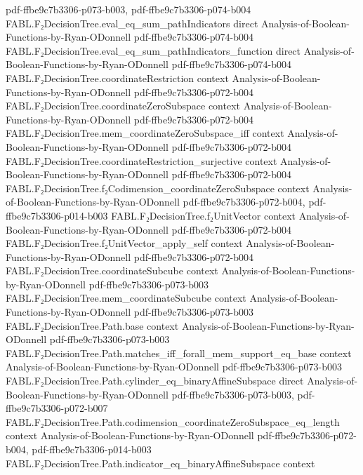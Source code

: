 \begin{theorem}
  {pdf-ffbe9c7b3306-p073-b003,
    pdf-ffbe9c7b3306-p074-b004}
\proofstep
  {FABL.F₂DecisionTree.eval_eq_sum_pathIndicators}
  {direct}
  {Analysis-of-Boolean-Functions-by-Ryan-ODonnell}
  {pdf-ffbe9c7b3306-p074-b004}
\proofstep
  {FABL.F₂DecisionTree.eval_eq_sum_pathIndicators_function}
  {direct}
  {Analysis-of-Boolean-Functions-by-Ryan-ODonnell}
  {pdf-ffbe9c7b3306-p074-b004}
\proofstep
  {FABL.F₂DecisionTree.coordinateRestriction}
  {context}
  {Analysis-of-Boolean-Functions-by-Ryan-ODonnell}
  {pdf-ffbe9c7b3306-p072-b004}
\proofstep
  {FABL.F₂DecisionTree.coordinateZeroSubspace}
  {context}
  {Analysis-of-Boolean-Functions-by-Ryan-ODonnell}
  {pdf-ffbe9c7b3306-p072-b004}
\proofstep
  {FABL.F₂DecisionTree.mem_coordinateZeroSubspace_iff}
  {context}
  {Analysis-of-Boolean-Functions-by-Ryan-ODonnell}
  {pdf-ffbe9c7b3306-p072-b004}
\proofstep
  {FABL.F₂DecisionTree.coordinateRestriction_surjective}
  {context}
  {Analysis-of-Boolean-Functions-by-Ryan-ODonnell}
  {pdf-ffbe9c7b3306-p072-b004}
\proofstep
  {FABL.F₂DecisionTree.f₂Codimension_coordinateZeroSubspace}
  {context}
  {Analysis-of-Boolean-Functions-by-Ryan-ODonnell}
  {pdf-ffbe9c7b3306-p072-b004,
    pdf-ffbe9c7b3306-p014-b003}
\proofstep
  {FABL.F₂DecisionTree.f₂UnitVector}
  {context}
  {Analysis-of-Boolean-Functions-by-Ryan-ODonnell}
  {pdf-ffbe9c7b3306-p072-b004}
\proofstep
  {FABL.F₂DecisionTree.f₂UnitVector_apply_self}
  {context}
  {Analysis-of-Boolean-Functions-by-Ryan-ODonnell}
  {pdf-ffbe9c7b3306-p072-b004}
\proofstep
  {FABL.F₂DecisionTree.coordinateSubcube}
  {context}
  {Analysis-of-Boolean-Functions-by-Ryan-ODonnell}
  {pdf-ffbe9c7b3306-p073-b003}
\proofstep
  {FABL.F₂DecisionTree.mem_coordinateSubcube}
  {context}
  {Analysis-of-Boolean-Functions-by-Ryan-ODonnell}
  {pdf-ffbe9c7b3306-p073-b003}
\proofstep
  {FABL.F₂DecisionTree.Path.base}
  {context}
  {Analysis-of-Boolean-Functions-by-Ryan-ODonnell}
  {pdf-ffbe9c7b3306-p073-b003}
\proofstep
  {FABL.F₂DecisionTree.Path.matches_iff_forall_mem_support_eq_base}
  {context}
  {Analysis-of-Boolean-Functions-by-Ryan-ODonnell}
  {pdf-ffbe9c7b3306-p073-b003}
\proofstep
  {FABL.F₂DecisionTree.Path.cylinder_eq_binaryAffineSubspace}
  {direct}
  {Analysis-of-Boolean-Functions-by-Ryan-ODonnell}
  {pdf-ffbe9c7b3306-p073-b003,
    pdf-ffbe9c7b3306-p072-b007}
\proofstep
  {FABL.F₂DecisionTree.Path.codimension_coordinateZeroSubspace_eq_length}
  {context}
  {Analysis-of-Boolean-Functions-by-Ryan-ODonnell}
  {pdf-ffbe9c7b3306-p072-b004,
    pdf-ffbe9c7b3306-p014-b003}
\proofstep
  {FABL.F₂DecisionTree.Path.indicator_eq_binaryAffineSubspace}
  {context}

\end{theorem}
